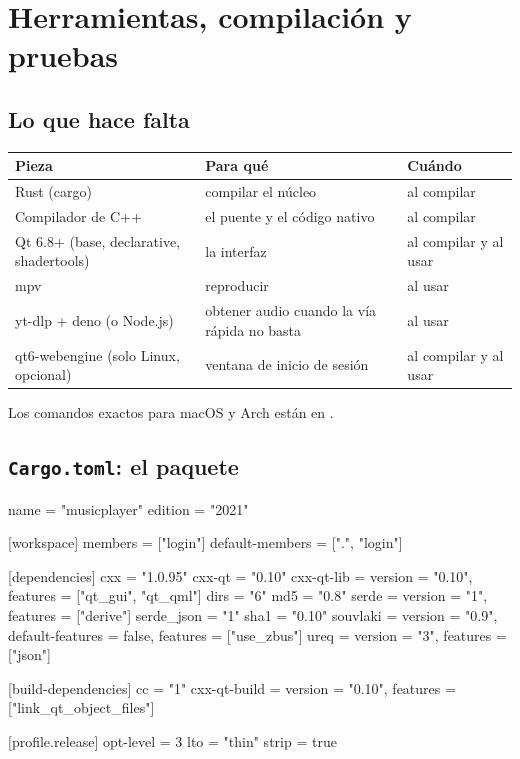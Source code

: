 \chapter{Herramientas, compilación y pruebas}
\label{cap:herramientas}

\section{Lo que hace falta}

\begin{center}
\begin{tabularx}{\linewidth}{@{}lXl@{}}
\toprule
Pieza & Para qué & Cuándo \\
\midrule
Rust (cargo) & compilar el núcleo & al compilar \\
Compilador de C++ & el puente y el código nativo & al compilar \\
Qt 6.8+ (base, declarative, shadertools) & la interfaz & al compilar y al usar \\
mpv & reproducir & al usar \\
yt-dlp + deno (o Node.js) & obtener audio cuando la vía rápida no basta & al usar \\
qt6-webengine (solo Linux, opcional) & ventana de inicio de sesión & al compilar y al usar \\
\bottomrule
\end{tabularx}
\end{center}

Los comandos exactos para macOS y Arch están en .

\section{\texttt{Cargo.toml}: el paquete}

\begin{codigo}
[package]
name = "musicplayer"
edition = "2021"

[workspace]
members = ["login"]
default-members = [".", "login"]

[dependencies]
cxx = "1.0.95"
cxx-qt = "0.10"
cxx-qt-lib = { version = "0.10", features = ["qt_gui", "qt_qml"] }
dirs = "6"
md5 = "0.8"
serde = { version = "1", features = ["derive"] }
serde_json = "1"
sha1 = "0.10"
souvlaki = { version = "0.9", default-features = false, features = ["use_zbus"] }
ureq = { version = "3", features = ["json"] }

[build-dependencies]
cc = "1"
cxx-qt-build = { version = "0.10", features = ["link_qt_object_files"] }

[profile.release]
opt-level = 3
lto = "thin"
strip = true
\end{codigo}

